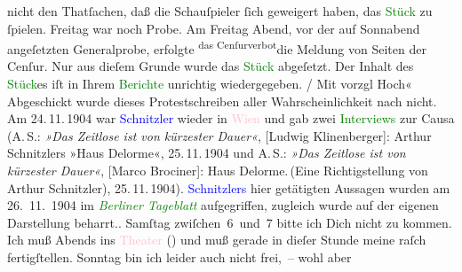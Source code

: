 {{{                        nicht den Thatſachen, daß die Schauſpieler ſich geweigert haben,  das \textcolor{green}{Stück} zu ſpielen. Freitag war noch Probe.  Am Freitag{ }Abend, vor der auf Sonnabend
                        angeſetzten Generalprobe, \strikeout{\textcolor{gray}{er}} erfolgte \substVorne{}\textsuperscript{das Cenſurverbot}{\allowbreak}\substDazwischen{}die Meldung von Seiten der Cenſur\substHinten{}. Nur aus dieſem Grunde wurde das \textcolor{green}{Stück} abgeſetzt. Der Inhalt des \textcolor{green}{Stück}es iſt in  Ihrem \textcolor{green}{Berichte} unrichtig wiedergegeben.{ / }Mit vorzgl Hoch« Abgeschickt wurde dieses Protestschreiben aller Wahrscheinlichkeit nach
                  nicht. Am 24. 11. 1904 war \textcolor{blue}{Schnitzler} wieder in \textcolor{pink}{Wien} und gab zwei \textcolor{green}{Interviews} zur Causa (A. S.: \emph{»Das Zeitlose ist von kürzester Dauer«}, [Ludwig Klinenberger]: Arthur Schnitzlers »Haus Delorme«, 25. 11. 1904 und A. S.: \emph{»Das Zeitlose ist von kürzester Dauer«}, [Marco Brociner]: Haus Delorme. (Eine Richtigstellung von Arthur Schnitzler), 25. 11. 1904). \textcolor{blue}{Schnitzlers} hier getätigten Aussagen wurden
                  am 26. 11. 1904 im \emph{\textcolor{green}{Berliner
                     Tageblatt}} aufgegriffen, zugleich wurde auf der eigenen Darstellung
                  beharrt.}}}\label{K_L03456-1h}. Samſtag{ }zwiſchen 6 und 7 bitte ich Dich nicht zu kommen. Ich muß
                  Abends ins \textcolor{pink}{Theater}{}\ledrightnote{{$\rightarrow$}\textcolor{pink}{Lessing-Theater}} (\label{K_L03456-2v}\label{K_L03456-2h}) und muß gerade in dieſer Stunde
               meine \label{K_L03456-3v}\label{K_L03456-3h} raſch fertigſtellen. {\pb}Sonntag bin ich leider auch nicht frei, – wohl aber
